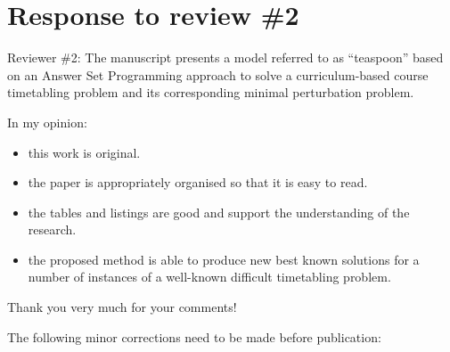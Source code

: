 \documentclass[a4j]{article}
\begin{document}
\section*{Response to review \#2}

\begin{it}\color{blue}
Reviewer \#2: The manuscript presents a model referred to as ``teaspoon''
based on an Answer Set Programming approach to solve a
curriculum-based course timetabling problem and its corresponding
minimal perturbation problem.

In my opinion:
\begin{itemize}
\item this work is original.
\item the paper is appropriately organised so that it is easy to read.
\item the tables and listings are good and support the understanding of the research.
\item the proposed method is able to produce new best known solutions
  for a number of instances of a well-known difficult timetabling
  problem.
\end{itemize}
\end{it}

Thank you very much for your comments!

\begin{it}\color{blue}
The following minor corrections need to be made before publication:
\end{it}
\end{document}
